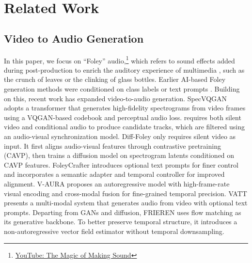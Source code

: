 \section{Related Work}
\label{sec:relatedworks}

\subsection{Video to Audio Generation}
In this paper, we focus on ``Foley'' audio,\footnote{\href{https://www.youtube.com/watch?v=UO3N_PRIgX0}{YouTube: The Magic of Making Sound}} which refers to sound effects added during post-production to enrich the auditory experience of multimedia \cite{choi2023foley}, such as the crunch of leaves or the clinking of glass bottles. Earlier AI-based Foley generation methods were conditioned on class labels \cite{liu2021conditional} or text prompts \cite{liu2023audioldm}. Building on this, recent work has expanded video-to-audio generation. SpecVQGAN \cite{iashin2021taming} adopts a transformer that generates high-fidelity spectrograms from video frames using a VQGAN-based codebook and perceptual audio loss. \cite{du2023conditional} requires both silent video and conditional audio to produce candidate tracks, which are filtered using an audio-visual synchronization model. Diff-Foley \cite{luo2024diff} only requires silent video as input. It first aligns audio-visual features through contrastive pretraining (CAVP), then trains a diffusion model on spectrogram latents conditioned on CAVP features. FoleyCrafter \cite{zhang2024foleycrafter} introduces optional text prompts for finer control and incorporates a semantic adapter and temporal controller for improved alignment. V-AURA \cite{viertola2025temporally} proposes an autoregressive model with high-frame-rate visual encoding and cross-modal fusion for fine-grained temporal precision. VATT \cite{liu2024tell} presents a multi-modal system that generates audio from video with optional text prompts. Departing from GANs and diffusion, FRIEREN \cite{wang2024frieren} uses flow matching as its generative backbone. To better preserve temporal structure, it introduces a non-autoregressive vector field estimator without temporal downsampling.



